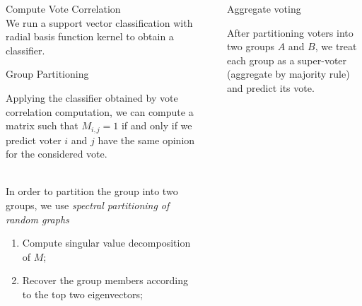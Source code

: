 \documentclass[final]{beamer}
\newlength{\sepwid}
\newlength{\onecolwid}
\begin{document}
\begin{frame}[t]
\begin{columns}[t]
\begin{column}{\onecolwid}
\begin{block}{Compute Vote Correlation}
    \quad \\
    
    We run a support vector classification with radial basis function kernel to obtain a classifier.
    
\end{block}


\begin{block}{Group Partitioning}

    Applying the classifier obtained by vote correlation computation, we can compute a matrix such that $M_{i,j} = 1$ if and only if we predict voter $i$ and $j$ have the same opinion for the considered vote.

    \quad \\
    
    In order to partition the group into two groups, we use {\em spectral partitioning of random graphs} 
    \begin{enumerate}
        \item Compute singular value decomposition of $M$;
        \item Recover the group members according to the top two eigenvectors;
    \end{enumerate}

\end{block}


\end{column} %

\begin{column}{\sepwid}\end{column} %

\begin{column}{\onecolwid} %


\begin{block}{Aggregate voting}

    After partitioning voters into two groups $A$ and $B$, we treat each group as a super-voter (aggregate by majority rule) and predict its vote.
    

\end{block}
\end{column}
\end{columns}
\end{frame}
\end{document}
